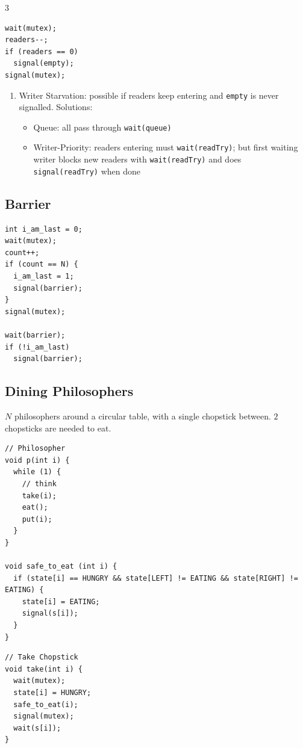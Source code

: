 \documentclass[12pt, a4paper]{article}
\begin{document}
\begin{multicols*}{3}
\begin{minipage}{0.5\columnwidth}
\begin{lstlisting}
wait(mutex);
readers--;
if (readers == 0)
  signal(empty);
signal(mutex);
  \end{lstlisting}
\end{minipage}
\begin{enumerate}[$-$]
  \item Writer Starvation: possible if readers keep entering and \lstinline|empty| is never signalled. Solutions:
    \begin{itemize}[leftmargin=*]\vspace{3pt}
      \item Queue: all pass through \lstinline|wait(queue)| 
      \item Writer-Priority: readers entering must \lstinline|wait(readTry)|; but first waiting writer blocks new readers with \lstinline|wait(readTry)| and does \lstinline|signal(readTry)| when done 
    \end{itemize}
\end{enumerate}

\subsection{Barrier}
\begin{lstlisting}
int i_am_last = 0;
wait(mutex);
count++;
if (count == N) {
  i_am_last = 1;
  signal(barrier); 
}
signal(mutex);

wait(barrier);
if (!i_am_last) 
  signal(barrier);
\end{lstlisting}
\colbreak
\subsection{Dining Philosophers}
$N$ philosophers around a circular table, with a single chopstick between. $2$ chopsticks are needed to eat.
\begin{minipage}{0.48\columnwidth}
  \begin{lstlisting}
// Philosopher
void p(int i) {
  while (1) {
    // think
    take(i);
    eat();
    put(i);
  }
}

void safe_to_eat (int i) {
  if (state[i] == HUNGRY && state[LEFT] != EATING && state[RIGHT] != EATING) {
    state[i] = EATING;
    signal(s[i]);
  }
}
  \end{lstlisting}
\end{minipage}
\begin{minipage}{0.45\columnwidth}
  \begin{lstlisting}
// Take Chopstick
void take(int i) {
  wait(mutex);
  state[i] = HUNGRY;
  safe_to_eat(i);
  signal(mutex);
  wait(s[i]);
}


\end{lstlisting}
\end{minipage}
\end{multicols*}
\end{document}

